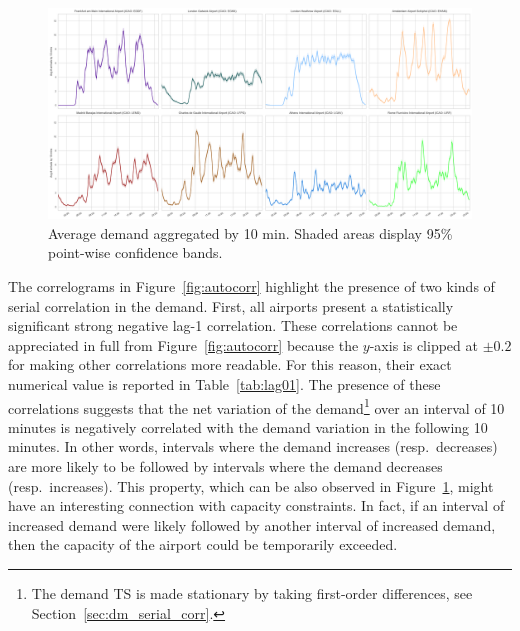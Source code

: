 \documentclass[]{elsarticle}
\begin{document}
\begin{figure}
  \includegraphics[width=\textwidth]{AvgArrivals}
  \caption{Average demand aggregated by 10 min. Shaded areas display 95\% point-wise confidence bands.}\label{fig:AvgArrivals}
\end{figure}

The correlograms in Figure~\ref{fig:autocorr} highlight the presence of two kinds of serial correlation in the demand.
First, all airports present a statistically significant strong negative lag-1 correlation.
These correlations cannot be appreciated in full from Figure~\ref{fig:autocorr} because the \(y\)-axis is clipped at \(\pm 0.2\) for making other correlations more readable. For this reason, their exact numerical value is reported in Table~\ref{tab:lag01}.
The presence of these correlations suggests that the net variation of the demand\footnote{The demand \ac{TS} is made stationary by taking first-order differences, see Section~\ref{sec:dm_serial_corr}.} over an interval of 10 minutes is negatively correlated with the demand variation in the following 10 minutes.
In other words, intervals where the demand increases (resp.\ decreases) are more likely to be followed by intervals where the demand decreases (resp.\ increases).
This property, which can be also observed in Figure~\ref{fig:AvgArrivals}, might have an interesting connection with capacity constraints.
In fact, if an interval of increased demand were likely followed by another interval of increased demand, then the capacity of the airport could be temporarily exceeded.
\end{document}

